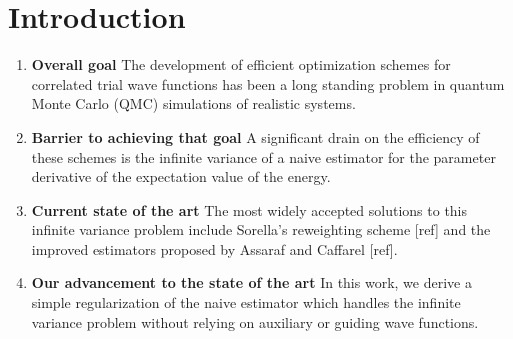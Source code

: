 \documentclass{article}
\begin{document}
\section{Introduction}
\begin{enumerate}
\item \textbf{Overall goal } The development of efficient optimization schemes for correlated trial wave functions has been a long standing problem in quantum Monte Carlo (QMC) simulations of realistic systems.

\item \textbf{Barrier to achieving that goal } A significant drain on the efficiency of these schemes is the infinite variance of a naive estimator for the parameter derivative of the expectation value of the energy.

\item \textbf{Current state of the art} The most widely accepted solutions to this infinite variance problem include Sorella's reweighting scheme [ref] and the improved estimators proposed by Assaraf and Caffarel [ref].

\item \textbf{Our advancement to the state of the art } In this work, we derive a simple regularization of the naive estimator which handles the infinite variance problem without relying on auxiliary or guiding wave functions.
\end{enumerate}

\pagebreak
\end{document}
